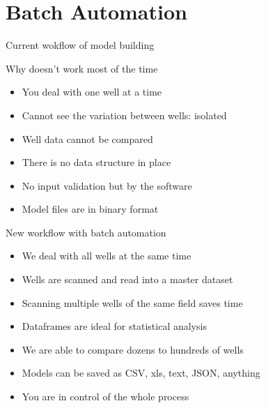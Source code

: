 \documentclass[14pt,ignorenonframetext,]{beamer}
\providecommand{\tightlist}{%
  \setlength{\itemsep}{0pt}\setlength{\parskip}{0pt}}
\begin{document}
\hypertarget{batch-automation}{%
\section{Batch Automation}\label{batch-automation}}

\begin{frame}{Current wokflow of model building}
\protect\hypertarget{current-wokflow-of-model-building}{}

\fontsize{13}{15}\sf
\begin{alertblock}{}
  Why doesn't work most of the time
\end{alertblock}

\vspace{1.0cm}

\begin{itemize}
\tightlist
\item
  You deal with one well at a time
\item
  Cannot see the variation between wells: isolated
\item
  Well data cannot be compared
\item
  There is no data structure in place
\item
  No input validation but by the software
\item
  Model files are in binary format
\end{itemize}

\end{frame}

\begin{frame}{New workflow with batch automation}
\protect\hypertarget{new-workflow-with-batch-automation}{}

\fontsize{13}{15}\sf

\begin{itemize}
\tightlist
\item
  We deal with all wells at the same time
\item
  Wells are scanned and read into a master dataset
\item
  Scanning multiple wells of the same field saves time
\item
  Dataframes are ideal for statistical analysis
\item
  We are able to compare dozens to hundreds of wells
\item
  Models can be saved as CSV, xls, text, JSON, anything
\item
  You are in control of the whole process
\end{itemize}

\end{frame}
\end{document}
